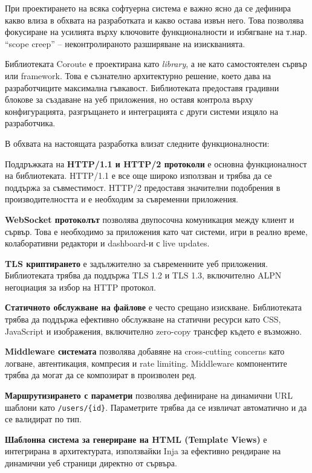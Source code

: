 При проектирането на всяка софтуерна система е важно ясно да се дефинира какво влиза в обхвата на разработката и какво остава извън него. Това позволява фокусиране на усилията върху ключовите функционалности и избягване на т.нар. ``scope creep'' -- неконтролираното разширяване на изискванията.

Библиотеката Coroute е проектирана като \textit{library}, а не като самостоятелен сървър или framework. Това е съзнателно архитектурно решение, което дава на разработчиците максимална гъвкавост. Библиотеката предоставя градивни блокове за създаване на уеб приложения, но оставя контрола върху конфигурацията, разгръщането и интеграцията с други системи изцяло на разработчика.

В обхвата на настоящата разработка влизат следните функционалности:

Поддръжката на \textbf{HTTP/1.1 и HTTP/2 протоколи} е основна функционалност на библиотеката. HTTP/1.1 е все още широко използван и трябва да се поддържа за съвместимост. HTTP/2 предоставя значителни подобрения в производителността и е необходим за съвременни приложения.

\textbf{WebSocket протоколът} позволява двупосочна комуникация между клиент и сървър. Това е необходимо за приложения като чат системи, игри в реално време, колаборативни редактори и dashboard-и с live updates.

\textbf{TLS криптирането} е задължително за съвременните уеб приложения. Библиотеката трябва да поддържа TLS 1.2 и TLS 1.3, включително ALPN негоциация за избор на HTTP протокол.

\textbf{Статичното обслужване на файлове} е често срещано изискване. Библиотеката трябва да поддържа ефективно обслужване на статични ресурси като CSS, JavaScript и изображения, включително zero-copy трансфер където е възможно.

\textbf{Middleware системата} позволява добавяне на cross-cutting concerns като логване, автентикация, компресия и rate limiting. Middleware компонентите трябва да могат да се композират в произволен ред.

\textbf{Маршрутизирането с параметри} позволява дефиниране на динамични URL шаблони като \texttt{/users/\{id\}}. Параметрите трябва да се извличат автоматично и да се валидират по тип.

\textbf{Шаблонна система за генериране на HTML (Template Views)} е интегрирана в архитектурата, използвайки Inja за ефективно рендиране на динамични уеб страници директно от сървъра.

